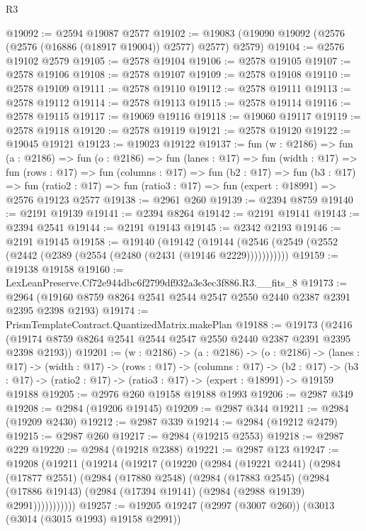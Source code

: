 \begin{lexlean}{R3}
\begin{coremodule}
@19092 := @2594 @19087 @2577
@19102 := @19083 (@19090 @19092 (@2576 (@2576 (@16886 (@18917 @19004)) @2577) @2577) @2579)
@19104 := @2576 @19102 @2579
@19105 := @2578 @19104
@19106 := @2578 @19105
@19107 := @2578 @19106
@19108 := @2578 @19107
@19109 := @2578 @19108
@19110 := @2578 @19109
@19111 := @2578 @19110
@19112 := @2578 @19111
@19113 := @2578 @19112
@19114 := @2578 @19113
@19115 := @2578 @19114
@19116 := @2578 @19115
@19117 := @19069 @19116
@19118 := @19060 @19117
@19119 := @2578 @19118
@19120 := @2578 @19119
@19121 := @2578 @19120
@19122 := @19045 @19121
@19123 := @19023 @19122
@19137 := fun (w : @2186) =>
  fun (a : @2186) =>
  fun (o : @2186) =>
  fun (lanes : @17) =>
  fun (width : @17) =>
  fun (rows : @17) =>
  fun (columns : @17) =>
  fun (b2 : @17) =>
  fun (b3 : @17) =>
  fun (ratio2 : @17) => fun (ratio3 : @17) => fun (expert : @18991) => @2576 @19123 @2577
@19138 := @2961 @260
@19139 := @2394 @8759
@19140 := @2191 @19139
@19141 := @2394 @8264
@19142 := @2191 @19141
@19143 := @2394 @2541
@19144 := @2191 @19143
@19145 := @2342 @2193
@19146 := @2191 @19145
@19158 := @19140
    (@19142 (@19144 (@2546 (@2549 (@2552 (@2442 (@2389 (@2554 (@2480 (@2431 (@19146 @2229)))))))))))
@19159 := @19138 @19158
@19160 := LexLeanPreserve.Cf72e944dbc6f2799df932a3e3ec3f886.R3.__fits_8
@19173 := @2964 (@19160 @8759 @8264 @2541 @2544 @2547 @2550 @2440 @2387 @2391 @2395 @2398 @2193)
@19174 := PrismTemplateContract.QuantizedMatrix.makePlan
@19188 := @19173
    (@2416 (@19174 @8759 @8264 @2541 @2544 @2547 @2550 @2440 @2387 @2391 @2395 @2398 @2193))
@19201 := (w : @2186) ->
  (a : @2186) ->
  (o : @2186) ->
  (lanes : @17) ->
  (width : @17) ->
  (rows : @17) ->
  (columns : @17) ->
  (b2 : @17) -> (b3 : @17) -> (ratio2 : @17) -> (ratio3 : @17) -> (expert : @18991) -> @19159 @19188
@19205 := @2976 @260 @19158 @19188 @1993
@19206 := @2987 @349
@19208 := @2984 (@19206 @19145)
@19209 := @2987 @344
@19211 := @2984 (@19209 @2430)
@19212 := @2987 @339
@19214 := @2984 (@19212 @2479)
@19215 := @2987 @260
@19217 := @2984 (@19215 @2553)
@19218 := @2987 @229
@19220 := @2984 (@19218 @2388)
@19221 := @2987 @123
@19247 := @19208
    (@19211
      (@19214
        (@19217
          (@19220
            (@2984
              (@19221 @2441)
              (@2984
                (@17877 @2551)
                (@2984
                  (@17880 @2548)
                  (@2984
                    (@17883 @2545)
                    (@2984
                      (@17886 @19143)
                      (@2984 (@17394 @19141) (@2984 (@2988 @19139) @2991)))))))))))
@19257 := @19205 @19247 (@2997 (@3007 @260)) (@3013 (@3014 (@3015 @1993) @19158 @2991))

\end{coremodule}
\end{lexlean}
